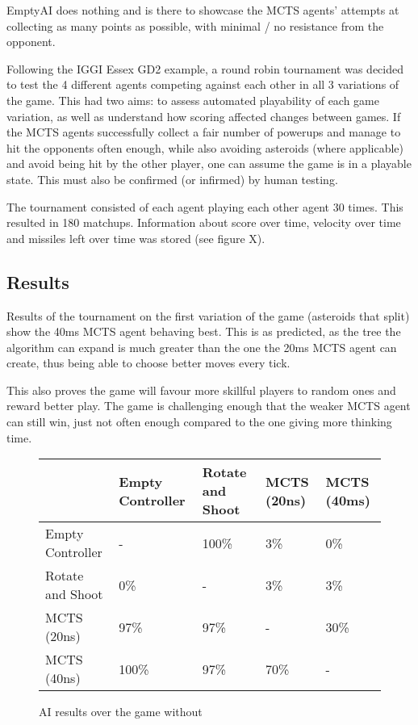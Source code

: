 EmptyAI does nothing and is there to showcase the MCTS agents’ attempts at collecting as many points as possible, with minimal / no resistance from the opponent.

Following the IGGI Essex GD2 example, a round robin tournament was decided to test the 4 different agents competing against each other in all 3 variations of the game. This had two aims: to assess automated playability of each game variation, as well as understand how scoring affected changes between games. If the MCTS agents successfully collect a fair number of powerups and manage to hit the opponents often enough, while also avoiding asteroids (where applicable) and avoid being hit by the other player, one can assume the game is in a playable state. This must also be confirmed (or infirmed) by human testing.

The tournament consisted of each agent playing each other agent 30 times. This resulted in 180 matchups. Information about score over time, velocity over time and missiles left over time was stored (see figure X).

\subsection{Results}

Results of the tournament on the first variation of the game (asteroids that split) show the 40ms MCTS agent behaving best. This is as predicted, as the tree the algorithm can expand is much greater than the one the 20ms MCTS agent can create, thus being able to choose better moves every tick. 

This also proves the game will favour more skillful players to random ones and reward better play. The game is challenging enough that the weaker MCTS agent can still win, just not often enough compared to the one giving more thinking time.

\begin{figure}
	\caption{AI results over the game without}
	\begin{tabular}{p{7.5em} | p{4.5em} p{4.5em} p{4.5em} p{4.5em}}
		&
			Empty Controller &
			Rotate and Shoot &
			MCTS (20ns) &
			MCTS (40ms) \\ \hline
		Empty Controller &
			-&
			100\% &
			3\% &
			0\% \\
		Rotate and Shoot &
			0\% &
			-&
			3\% &
			3\% \\ 
		MCTS (20ns) &
			97\% &
			97\% &
			-&
			30\% \\
		MCTS (40ns) &
			100\% &
			97\% &
			70\% &
			-\\
	\end{tabular}
\end{figure}


